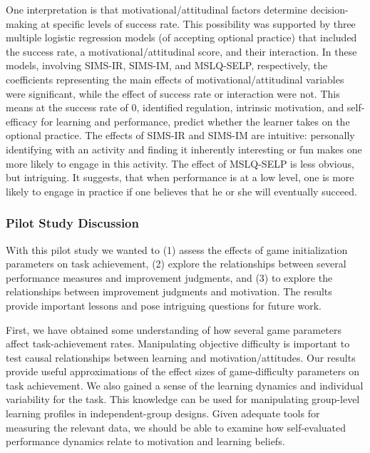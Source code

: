 One interpretation is that motivational/attitudinal factors determine decision-making at specific levels of success rate. This possibility was supported by three multiple logistic regression models (of accepting optional practice) that included the success rate, a motivational/attitudinal score, and their interaction. In these models, involving \ac{SIMS}-IR, \ac{SIMS}-IM, and \ac{MSLQ}-SELP, respectively, the coefficients representing the main effects of motivational/attitudinal variables were significant, while the effect of success rate or interaction were not. This means at the success rate of 0, identified regulation, intrinsic motivation, and self-efficacy for learning and performance, predict whether the learner takes on the optional practice. The effects of \ac{SIMS}-IR and \ac{SIMS}-IM are intuitive: personally identifying with an activity and finding it inherently interesting or fun makes one more likely to engage in this activity. The effect of \ac{MSLQ}-SELP is less obvious, but intriguing. It suggests, that when performance is at a low level, one is more likely to engage in practice if one believes that he or she will eventually succeed.

\subsubsection{Pilot Study Discussion}
With this pilot study we wanted to (1) assess the effects of game initialization parameters on task achievement, (2) explore the relationships between several performance measures and improvement judgments, and (3) to explore the relationships between improvement judgments and motivation. The results provide important lessons and pose intriguing questions for future work.

First, we have obtained some understanding of how several game parameters affect task-achievement rates. Manipulating objective difficulty is important to test causal relationships between learning and motivation/attitudes. Our results provide useful approximations of the effect sizes of game-difficulty parameters on task achievement. We also gained a sense of the learning dynamics and individual variability for the task. This knowledge can be used for manipulating group-level learning profiles in independent-group designs. Given adequate tools for measuring the relevant data, we should be able to examine how self-evaluated performance dynamics relate to motivation and learning beliefs.

